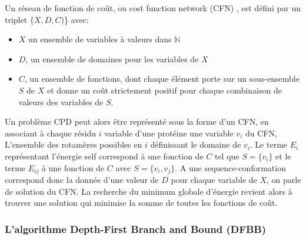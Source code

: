 Un réseau de fonction de coût, ou \og cost function network  \fg (CFN) , est défini par un triplet $\{X,D,C$)\} avec:

\begin{itemize}
\item $X$ un ensemble de variables à valeurs dans $\mathbb{N}$
\item $D$, un ensemble de domaines pour les variables de $X$
 \item $C$, un ensemble de fonctions, dont chaque élément porte sur un sous-ensemble $S$ de $X$ et donne un coût strictement positif pour chaque combinaison de valeurs des variables de $S$.

\end{itemize}  


Un problème CPD peut alors être représenté sous la forme d'un CFN, en associant à chaque résidu $i$ variable d'une protéine une variable $v_i$ du CFN, L'ensemble des rotamères possibles en $i$ définissant le domaine de $v_i$. Le terme $E_i$ représentant l'énergie \og self \fg correspond à une fonction de $C$ tel que $S=\{v_i\}$ et le terme $E_{ij}$ à une fonction de $C$ avec $S=\{v_i,v_j\}$. A une sequence-conformation correspond donc la donnée d'une valeur de $D$ pour chaque variable de $X$, on parle de solution du CFN. La recherche du minimum globale d'énergie revient alors à trouver une solution qui minimise la somme de toutes les fonctions de coût.

\subsubsection{L'algorithme \og Depth-First Branch and Bound \fg (DFBB)}

